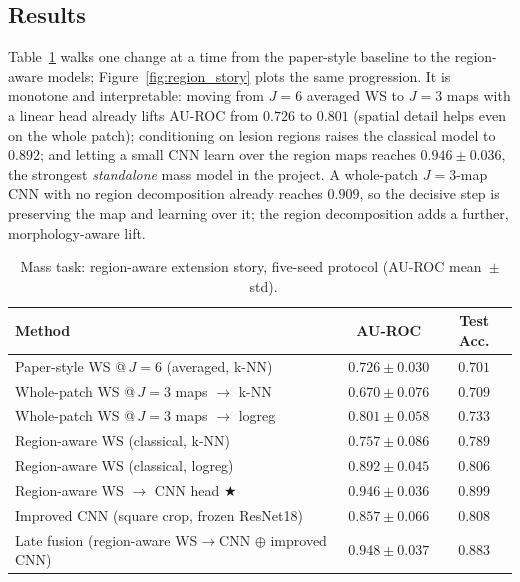 \subsection*{Results}
Table~\ref{tab:region_story} walks one change at a time from the paper-style baseline to the region-aware models; Figure~\ref{fig:region_story} plots the same progression. It is monotone and interpretable: moving from $J=6$ averaged WS to $J=3$ maps with a linear head already lifts AU-ROC from $0.726$ to $0.801$ (spatial detail helps even on the whole patch); conditioning on lesion regions raises the classical model to $0.892$; and letting a small CNN learn over the region maps reaches $\mathbf{0.946 \pm 0.036}$, the strongest \emph{standalone} mass model in the project. A whole-patch $J=3$-map CNN with no region decomposition already reaches $0.909$, so the decisive step is preserving the map and learning over it; the region decomposition adds a further, morphology-aware lift.

\begin{table}[H]
\centering
\caption[Mass task: region-aware extension story]{Mass task: region-aware extension story, five-seed protocol (AU-ROC mean~$\pm$~std).}
\label{tab:region_story}
\begin{tabular}{lcc}
\toprule
\textbf{Method} & \textbf{AU-ROC} & \textbf{Test Acc.} \\
\midrule
Paper-style WS @\,$J{=}6$ (averaged, k-NN)                  & $0.726 \pm 0.030$  & $0.701$ \\
Whole-patch WS @\,$J{=}3$ maps $\rightarrow$ k-NN           & $0.670 \pm 0.076$  & $0.709$ \\
Whole-patch WS @\,$J{=}3$ maps $\rightarrow$ logreg         & $0.801 \pm 0.058$  & $0.733$ \\
Region-aware WS (classical, k-NN)                           & $0.757 \pm 0.086$  & $0.789$ \\
Region-aware WS (classical, logreg)                         & $0.892 \pm 0.045$  & $0.806$ \\
Region-aware WS $\rightarrow$ CNN head $\bigstar$           & $0.946 \pm 0.036$  & $0.899$ \\
Improved CNN (square crop, frozen ResNet18)                & $0.857 \pm 0.066$  & $0.808$ \\
Late fusion (region-aware WS$\rightarrow$CNN $\oplus$ improved CNN) & $0.948 \pm 0.037$  & $0.883$ \\
\bottomrule
\end{tabular}
\end{table}

